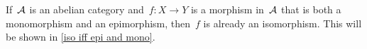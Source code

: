 \begin{remark*}
  If~$\mathcal{A}$ is an abelian category and~$f \colon X \to Y$ is a morphism in~$\mathcal{A}$ that is both a monomorphism and an epimorphism, then~$f$ is already an isomorphism.
  This will be shown in \cref{iso iff epi and mono}.
%   
\end{remark*}


